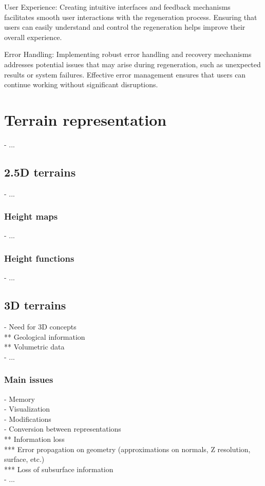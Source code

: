 User Experience: Creating intuitive interfaces and feedback mechanisms facilitates smooth user interactions with the regeneration process. Ensuring that users can easily understand and control the regeneration helps improve their overall experience.

Error Handling: Implementing robust error handling and recovery mechanisms addresses potential issues that may arise during regeneration, such as unexpected results or system failures. Effective error management ensures that users can continue working without significant disruptions.

\section{Terrain representation}
\label{sec:state-of-the-art_terrain-representations}
- ...

\subsection{2.5D terrains}
- ...

\subsubsection{Height maps}
- ...

\subsubsection{Height functions}
- ...

\subsection{3D terrains}
- Need for 3D concepts \\
** Geological information \\
** Volumetric data \\
- ...

\subsubsection{Main issues}
- Memory \\
- Visualization \\
- Modifications \\
- Conversion between representations \\
** Information loss \\
*** Error propagation on geometry (approximations on normals, Z resolution, surface, etc.) \\
*** Loss of subsurface information \\
- ...

